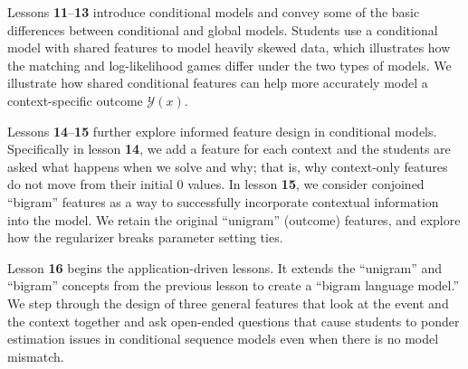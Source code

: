 \documentclass[11pt,letterpaper]{article}
\begin{document}
Lessons \textbf{11}--\textbf{13} introduce conditional models and convey some of the basic differences between 
conditional and global models. Students use a conditional model with shared features to model 
heavily skewed data, which illustrates how the matching and log-likelihood games differ under the two types of 
models. We illustrate how shared conditional features can help more accurately model a context-specific 
outcome $\mathcal{Y}(x)$.

Lessons \textbf{14}--\textbf{15} further explore informed feature design in conditional models. 
Specifically in lesson \textbf{14}, we add a feature for each context and the students are asked what happens 
when we solve and why; that is, why context-only features do not move from their initial 0 values. 
In lesson \textbf{15}, we consider conjoined ``bigram'' features as a way to successfully incorporate 
contextual information into the model. We retain the original ``unigram'' (outcome) features, and explore
how the regularizer breaks parameter setting ties.

Lesson \textbf{16} begins the application-driven lessons. It extends the ``unigram'' and ``bigram'' concepts 
from the previous lesson to create a ``bigram language model.'' We step through the design of three general 
features that look at the event and the context together and ask open-ended questions that cause students 
to ponder estimation issues in conditional sequence models even when there is no model mismatch.
\end{document}
